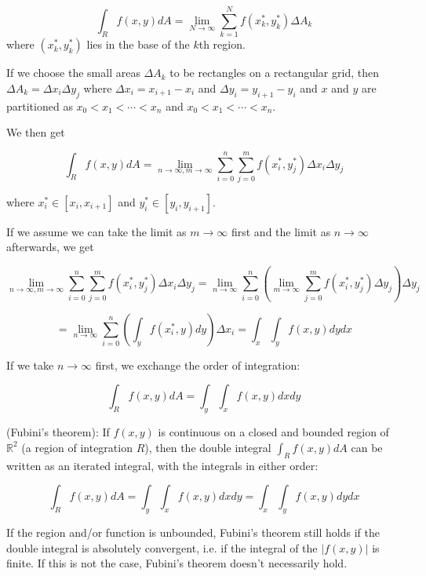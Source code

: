 \[\int_R f(x, y) dA = \lim_{N \rightarrow \infty} \sum_{k = 1}^N f(x_k^*, y_k^*) \Delta A_k\] where $(x_k^*, y_k^*)$ lies in the base of the $k$th region.

If we choose the small areas $\Delta A_k$ to be rectangles on a rectangular grid, then $\Delta A_k = \Delta x_i \Delta y_j$ where $\Delta x_i = x_{i + 1} - x_i$ and $\Delta y_i = y_{i + 1} - y_i$ and $x$ and $y$ are partitioned as $x_0 < x_1 < \cdots < x_n$ and $x_0 < x_1 < \cdots < x_n$.

We then get

\[\int_R f(x, y) dA = \lim_{n \rightarrow \infty, m \rightarrow \infty} \sum_{i = 0}^n \sum_{j = 0}^m f(x_i^*, y_j^*) \Delta x_i \Delta y_j\]

where $x_i^* \in [x_i, x_{i + 1}]$ and $y_i^* \in [y_i, y_{i + 1}]$.

If we assume we can take the limit as $m \rightarrow \infty$ first and the limit as $n \rightarrow \infty$ afterwards, we get

\[\lim_{n \rightarrow \infty, m \rightarrow \infty} \sum_{i = 0}^n \sum_{j = 0}^m f(x_i^*, y_j^*) \Delta x_i \Delta y_j = \lim_{n \rightarrow \infty} \sum_{i = 0}^n (\lim_{m \rightarrow \infty} \sum_{j = 0}^m f(x_i^*, y_j^*) \Delta y_j) \Delta y_j\]

\[= \lim_{n \rightarrow \infty} \sum_{i = 0}^n (\int_y f(x_i^*, y) dy) \Delta x_i = \int_x \int_y f(x, y) dy dx\]

If we take $n \rightarrow \infty$ first, we exchange the order of integration:

\[\int_R f(x, y) dA = \int_y \int_x f(x, y) dx dy\]

\begin{theorem}
	(Fubini's theorem): If $f(x, y)$ is continuous on a closed and bounded region of $\mathbb{R}^2$ (a region of integration $R$), then the double integral $\int_R f(x, y) dA$ can be written as an iterated integral, with the integrals in either order:

	\[\int_R f(x, y) dA = \int_y \int_x f(x, y) dx dy = \int_x \int_y f(x, y) dy dx\]
\end{theorem}

\begin{remark}
	If the region and/or function is unbounded, Fubini's theorem still holds if the double integral is absolutely convergent, i.e. if the integral of the $|f(x, y)|$ is finite. If this is not the case, Fubini's theorem doesn't necessarily hold.
\end{remark}

